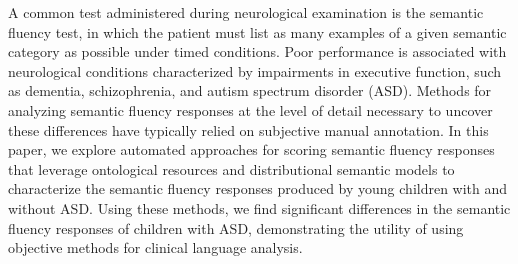 A common test administered during neurological examination is the semantic fluency test, in which the patient must list as many examples of a given semantic category as possible under timed conditions. Poor performance is associated with neurological conditions characterized by impairments in executive function, such as dementia, schizophrenia, and autism spectrum disorder (ASD). Methods for analyzing semantic fluency responses at the level of detail necessary to uncover these differences have typically relied on subjective manual annotation. In this paper, we explore automated approaches for scoring semantic fluency responses that leverage ontological resources and distributional semantic models to characterize the semantic fluency responses produced by young children with and without ASD. Using these methods, we find significant differences in the semantic fluency responses of children with ASD, demonstrating the utility of using objective methods for clinical language analysis.
